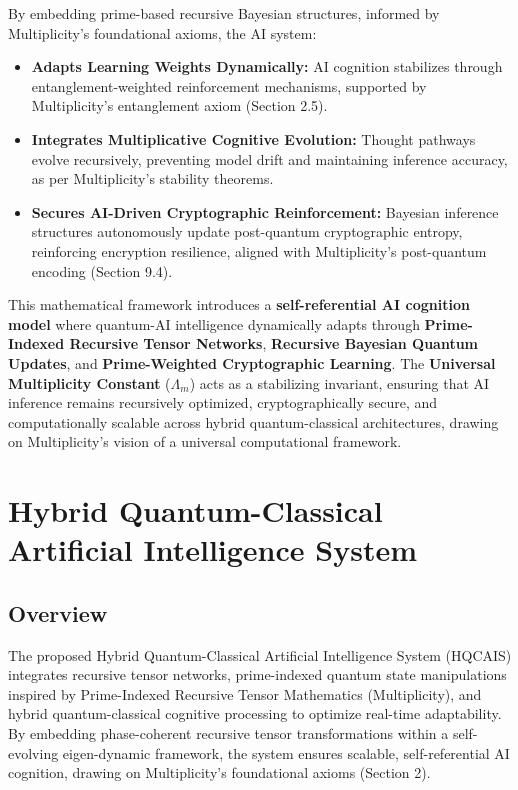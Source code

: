 \documentclass[12pt]{article}
\begin{document}
By embedding prime-based recursive Bayesian structures, informed by Multiplicity’s foundational axioms, the AI system:
\begin{itemize}
    \item \textbf{Adapts Learning Weights Dynamically:} AI cognition stabilizes through entanglement-weighted reinforcement mechanisms, supported by Multiplicity’s entanglement axiom (Section 2.5).
    \item \textbf{Integrates Multiplicative Cognitive Evolution:} Thought pathways evolve recursively, preventing model drift and maintaining inference accuracy, as per Multiplicity’s stability theorems.
    \item \textbf{Secures AI-Driven Cryptographic Reinforcement:} Bayesian inference structures autonomously update post-quantum cryptographic entropy, reinforcing encryption resilience, aligned with Multiplicity’s post-quantum encoding (Section 9.4).
\end{itemize}

This mathematical framework introduces a \textbf{self-referential AI cognition model} where quantum-AI intelligence dynamically adapts through \textbf{Prime-Indexed Recursive Tensor Networks}, \textbf{Recursive Bayesian Quantum Updates}, and \textbf{Prime-Weighted Cryptographic Learning}. The \textbf{Universal Multiplicity Constant} (\(\Lambda_m\)) acts as a stabilizing invariant, ensuring that AI inference remains recursively optimized, cryptographically secure, and computationally scalable across hybrid quantum-classical architectures, drawing on Multiplicity’s vision of a universal computational framework.


\section{Hybrid Quantum-Classical Artificial Intelligence System}

\subsection{Overview}

The proposed Hybrid Quantum-Classical Artificial Intelligence System (HQCAIS) integrates recursive tensor networks, prime-indexed quantum state manipulations inspired by Prime-Indexed Recursive Tensor Mathematics (Multiplicity), and hybrid quantum-classical cognitive processing to optimize real-time adaptability. By embedding phase-coherent recursive tensor transformations within a self-evolving eigen-dynamic framework, the system ensures scalable, self-referential AI cognition, drawing on Multiplicity’s foundational axioms (Section 2).
\end{document}
